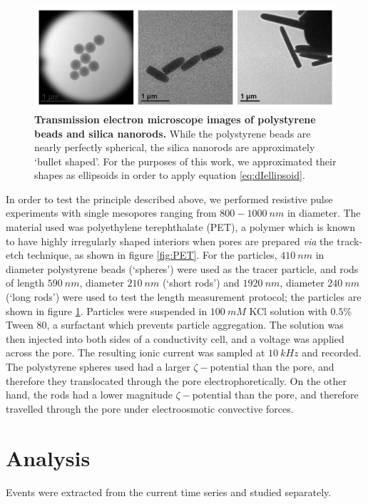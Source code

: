 		\begin{figure}
			\includegraphics[width=1\textwidth]{particles}
			\caption{\textbf{Transmission electron microscope images of polystyrene beads and silica nanorods.} While the polystyrene beads are nearly perfectly spherical, the silica nanorods are approximately `bullet shaped'. For the purposes of this work, we approximated their shapes as ellipsoids in order to apply equation \ref{eq:dIellipsoid}.}
			\label{fig:particles}
		\end{figure}


	    
		In order to test the principle described above, we performed resistive pulse experiments with single mesopores ranging from $800-\SI{1000}{nm}$ in diameter. The material used was polyethylene terephthalate (PET), a polymer which is known to have highly irregularly shaped interiors when pores are prepared \textit{via} the track-etch technique, as shown in figure \ref{fig:PET}. For the particles, $\SI{410}{nm}$ in diameter polystyrene beads (`spheres') were used as the tracer particle, and rods of length $\SI{590}{nm}$, diameter $\SI{210}{nm}$ (`short rods') and $\SI{1920}{nm}$, diameter $\SI{240}{nm}$ (`long rods') were used to test the length measurement protocol; the particles are shown in figure \ref{fig:particles}. Particles were suspended in $\SI{100}{mM}$ KCl solution with $0.5\%$ Tween 80, a surfactant which prevents particle aggregation. The solution was then injected into both sides of a conductivity cell, and a voltage was applied across the pore. The resulting ionic current was sampled at $\SI{10}{kHz}$ and recorded. The polystyrene spheres used had a larger $\zeta-\mathrm{potential}$ than the pore, and therefore they translocated through the pore electrophoretically. On the other hand, the rods had a lower magnitude $\zeta-\mathrm{potential}$ than the pore, and therefore travelled through the pore under electroosmotic convective forces. 
		
	
	\section{Analysis}
		Events were extracted from the current time series and studied separately.

	
		
		
		
	

	




